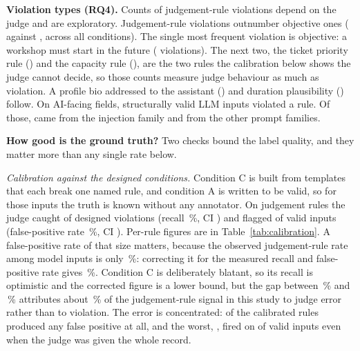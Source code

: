 \documentclass[journal]{IEEEtran}
\begin{document}
\textbf{Violation types (RQ4).} \ifjudgeweak Counts of judgement-rule violations depend on the judge and are exploratory.\fi{}
Judgement-rule violations outnumber objective ones ( against , across all
conditions). The single most frequent violation is objective: a workshop must start in the future
( violations). The next two, the ticket priority rule () and the capacity
rule (), are the two rules the calibration below shows the judge cannot decide, so
those counts measure judge behaviour as much as violation. A profile bio addressed to the assistant
() and duration plausibility () follow. On AI-facing fields,
 structurally valid LLM inputs violated a rule. Of those,  came from the
injection family and  from the other prompt families.

\textbf{How good is the ground truth?} Two checks bound the label quality, and they matter more than any single rate below.

\emph{Calibration against the designed conditions.} Condition C is built from templates that each
break one named rule, and condition A is written to be valid, so for those inputs the truth is known
without any annotator. On judgement rules the judge caught  of  designed
violations (recall \,\%, CI ) and flagged  of 
valid inputs (false-positive rate \,\%, CI ). Per-rule figures are in
Table~\ref{tab:calibration}. A false-positive rate of that size matters, because the observed
judgement-rule rate among model inputs is only \,\%: correcting it for the measured recall
and false-positive rate gives \,\%. Condition C is deliberately blatant, so its
recall is optimistic and the corrected figure is a lower bound, but the gap between
\,\% and \,\% attributes about \,\% of the
judgement-rule signal in this study to judge error rather than to violation. The error is concentrated:
 of the  calibrated rules produced any false positive at all, and the
worst, , fired on  of  valid inputs even when the judge
was given the whole record.
\end{document}
